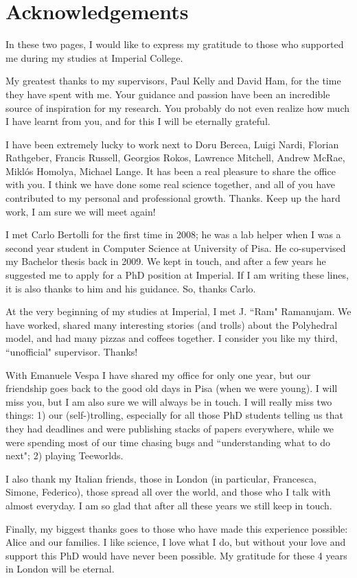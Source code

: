 \chapter*{Acknowledgements}\thispagestyle{plain}
In these two pages, I would like to express my gratitude to those who supported me during my studies at Imperial College. 

My greatest thanks to my supervisors, Paul Kelly and David Ham, for the time they have spent with me. Your guidance and passion have been an incredible source of inspiration for my research. You probably do not even realize how much I have learnt from you, and for this I will be eternally grateful.

I have been extremely lucky to work next to Doru Bercea, Luigi Nardi, Florian Rathgeber, Francis Russell, Georgios Rokos, Lawrence Mitchell, Andrew McRae, Miklós Homolya, Michael Lange. It has been a real pleasure to share the office with you. I think we have done some real science together, and all of you have contributed to my personal and professional growth. Thanks. Keep up the hard work, I am sure we will meet again!

I met Carlo Bertolli for the first time in 2008; he was a lab helper when I was a second year student in Computer Science at University of Pisa. He co-supervised my Bachelor thesis back in 2009. We kept in touch, and after a few years he suggested me to apply for a PhD position at Imperial. If I am writing these lines, it is also thanks to him and his guidance. So, thanks Carlo. 

At the very beginning of my studies at Imperial, I met J. ``Ram" Ramanujam. We have worked, shared many interesting stories (and trolls) about the Polyhedral model, and had many pizzas and coffees together. I consider you like my third, ``unofficial" supervisor. Thanks!

With Emanuele Vespa I have shared my office for only one year, but our friendship goes back to the good old days in Pisa (when we were young). I will miss you, but I am also sure we will always be in touch. I will really miss two things: 1) our (self-)trolling, especially for all those PhD students telling us that they had deadlines and were publishing stacks of papers everywhere, while we were spending most of our time chasing bugs and ``understanding what to do next"; 2) playing Teeworlds. 

I also thank my Italian friends, those in London (in particular, Francesca, Simone, Federico), those spread all over the world, and those who I talk with almost everyday. I am so glad that after all these years we still keep in touch. 

Finally, my biggest thanks goes to those who have made this experience possible: Alice and our families. I like science, I love what I do, but without your love and support this PhD would have never been possible. My gratitude for these 4 years in London will be eternal.

